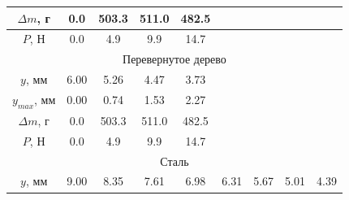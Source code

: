 \documentclass[12pt]{article}
\begin{document}
\begin{enumerate}
\begin{table}[H]
\begin{tabular}{|ccccccccc|}
            \multicolumn{1}{|c|}{$\Delta m$, г} & \multicolumn{1}{c|}{0.0}  & \multicolumn{1}{c|}{503.3} & \multicolumn{1}{c|}{511.0} & \multicolumn{1}{c|}{482.5} & \multicolumn{1}{c|}{}      & \multicolumn{1}{c|}{}      & \multicolumn{1}{c|}{}      &       \\ \hline
            \multicolumn{1}{|c|}{$P$, Н}        & \multicolumn{1}{c|}{0.0}  & \multicolumn{1}{c|}{4.9}   & \multicolumn{1}{c|}{9.9}   & \multicolumn{1}{c|}{14.7}  & \multicolumn{1}{c|}{}      & \multicolumn{1}{c|}{}      & \multicolumn{1}{c|}{}      &       \\ \hline
            \multicolumn{9}{|c|}{Перевернутое дерево}                                                                                                                                                                                                             \\ \hline
            \multicolumn{1}{|c|}{$y$, мм}       & \multicolumn{1}{c|}{6.00} & \multicolumn{1}{c|}{5.26}  & \multicolumn{1}{c|}{4.47}  & \multicolumn{1}{c|}{3.73}  & \multicolumn{1}{c|}{}      & \multicolumn{1}{c|}{}      & \multicolumn{1}{c|}{}      &       \\ \hline
            \multicolumn{1}{|c|}{$y_{max}$, мм} & \multicolumn{1}{c|}{0.00} & \multicolumn{1}{c|}{0.74}  & \multicolumn{1}{c|}{1.53}  & \multicolumn{1}{c|}{2.27}  & \multicolumn{1}{c|}{}      & \multicolumn{1}{c|}{}      & \multicolumn{1}{c|}{}      &       \\ \hline
            \multicolumn{1}{|c|}{$\Delta m$, г} & \multicolumn{1}{c|}{0.0}  & \multicolumn{1}{c|}{503.3} & \multicolumn{1}{c|}{511.0} & \multicolumn{1}{c|}{482.5} & \multicolumn{1}{c|}{}      & \multicolumn{1}{c|}{}      & \multicolumn{1}{c|}{}      &       \\ \hline
            \multicolumn{1}{|c|}{$P$, Н}        & \multicolumn{1}{c|}{0.0}  & \multicolumn{1}{c|}{4.9}   & \multicolumn{1}{c|}{9.9}   & \multicolumn{1}{c|}{14.7}  & \multicolumn{1}{c|}{}      & \multicolumn{1}{c|}{}      & \multicolumn{1}{c|}{}      &       \\ \hline
            \multicolumn{9}{|c|}{Сталь}                                                                                                                                                                                                                           \\ \hline
            \multicolumn{1}{|c|}{$y$, мм}       & \multicolumn{1}{c|}{9.00} & \multicolumn{1}{c|}{8.35}  & \multicolumn{1}{c|}{7.61}  & \multicolumn{1}{c|}{6.98}  & \multicolumn{1}{c|}{6.31}  & \multicolumn{1}{c|}{5.67}  & \multicolumn{1}{c|}{5.01}  & 4.39  \\ \hline

\end{tabular}
\end{table}
\end{enumerate}
\end{document}

